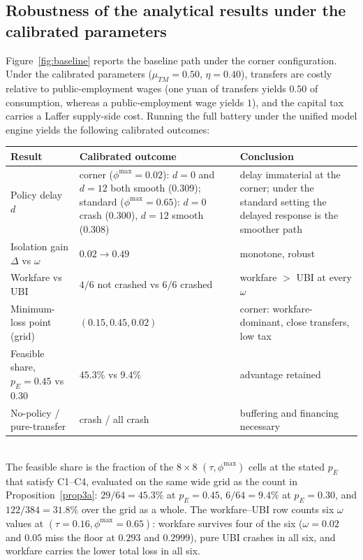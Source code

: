 \documentclass[review,12pt]{elsarticle}
\theoremstyle{plain}
\theoremstyle{definition}
\theoremstyle{remark}
\begin{document}
\subsection{Robustness of the analytical results under the calibrated parameters}
Figure~\ref{fig:baseline} reports the baseline path under the corner configuration. Under the calibrated parameters ($\mu_{TM}=0.50$, $\eta=0.40$), transfers are costly relative to public-employment wages (one yuan of transfers yields $0.50$ of consumption, whereas a public-employment wage yields $1$), and the capital tax carries a Laffer supply-side cost. Running the full battery under the unified model engine yields the following calibrated outcomes:

\begin{center}
\small
\begin{tabular}{@{}
>{\raggedright\arraybackslash}p{1.55in}
>{\raggedright\arraybackslash}p{2.15in}
>{\raggedright\arraybackslash}p{2.45in}@{}}
\toprule
Result & Calibrated outcome & Conclusion \\
\midrule
Policy delay $d$ & corner ($\phi^{\max}{=}0.02$): $d{=}0$ and $d{=}12$ both smooth (0.309); standard ($\phi^{\max}{=}0.65$): $d{=}0$ crash (0.300), $d{=}12$ smooth (0.308) & delay immaterial at the corner; under the standard setting the delayed response is the smoother path \\
Isolation gain $\Delta$ vs $\omega$ & $0.02\to0.49$ & monotone, robust \\
Workfare vs UBI & $4/6$ not crashed vs $6/6$ crashed & workfare $>$ UBI at every $\omega$ \\
Minimum-loss point (grid) & $(0.15,0.45,0.02)$ & corner: workfare-dominant, close transfers, low tax \\
Feasible share, $p_E{=}0.45$ vs $0.30$ & $45.3\%$ vs $9.4\%$ & advantage retained \\
No-policy / pure-transfer & crash / all crash & buffering and financing necessary \\
\bottomrule
\end{tabular}
\\[2pt]
\footnotesize The feasible share is the fraction of the $8\times8$ $(\tau,\phi^{\max})$ cells at the stated $p_E$ that satisfy C1--C4, evaluated on the same wide grid as the count in Proposition~\ref{prop3a}: $29/64=45.3\%$ at $p_E=0.45$, $6/64=9.4\%$ at $p_E=0.30$, and $122/384=31.8\%$ over the grid as a whole. The workfare--UBI row counts six $\omega$ values at $(\tau=0.16,\phi^{\max}=0.65)$: workfare survives four of the six ($\omega=0.02$ and $0.05$ miss the floor at $0.293$ and $0.2999$), pure UBI crashes in all six, and workfare carries the lower total loss in all six.
\end{center}
\end{document}
